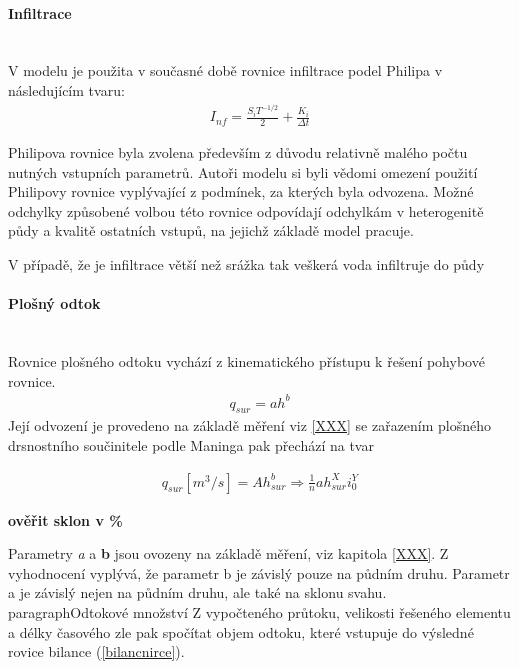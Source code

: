 \documentclass[a4paper, 12pt, twoside]{article}
\begin{document}
\paragraph{Infiltrace}  \mbox{} \\

V modelu je použita v současné době rovnice infiltrace podel Philipa \citep{PhillipXX} v následujícím tvaru:
\begin{eqnarray} \label{phillip}
I_{nf} = \frac{S_{i}T^{-1/2}}{2}+\frac{K_{i}}{\Delta t}
\end{eqnarray}

Philipova rovnice byla zvolena především z důvodu relativně malého počtu nutných vstupních parametrů. Autoři modelu si byli vědomi omezení použití Philipovy rovnice vyplývající z podmínek, za kterých byla odvozena.  Možné odchylky způsobené volbou této rovnice odpovídají odchylkám v heterogenitě půdy a kvalitě ostatních vstupů, na jejichž základě model pracuje.

V případě, že je infiltrace větší než srážka tak veškerá voda infiltruje do půdy

\paragraph{Plošný odtok} \label{rce_odtok}  \mbox{} \\

Rovnice plošného odtoku vychází z kinematického přístupu k řešení pohybové rovnice.
\begin{eqnarray}
q_{sur} = ah^{b}
\end{eqnarray}
Její odvození je provedeno na základě měření viz \ref{XXX} se zařazením plošného drsnostního součinitele podle Maninga pak přechází na tvar

\begin{eqnarray}
q_{sur} [m^{3}/s] = Ah_{sur}^{b} \Rightarrow \frac {1}{n} a h_{sur}^{X} i_{0}^{Y}
\end{eqnarray}

\textbf{ověřit sklon v \%}

Parametry \textit{a} a \textbf{b} jsou ovozeny na základě měření, viz kapitola \ref{XXX}. 
Z vyhodnocení vyplývá, že parametr b je závislý pouze na půdním druhu. Parametr a je závislý nejen na půdním druhu, ale také na sklonu svahu.
\\paragraph{Odtokové množství}
Z vypočteného průtoku, velikosti řešeného elementu a délky časového zle pak spočítat objem odtoku, které vstupuje do výsledné rovice bilance (\ref{bilancnirce}).
\end{document}
